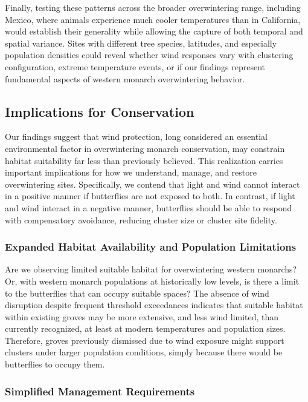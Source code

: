 \documentclass[insects,article,submit,pdftex,moreauthors]{Definitions/mdpi}
\begin{document}
Finally, testing these patterns across the broader overwintering range, including Mexico, where animals experience much cooler temperatures than in California, would establish their generality while allowing the capture of both temporal and spatial variance. Sites with different tree species, latitudes, and especially population densities could reveal whether wind responses vary with clustering configuration, extreme temperature events, or if our findings represent fundamental aspects of western monarch overwintering behavior.

\subsection{Implications for Conservation}

Our findings suggest that wind protection, long considered an essential environmental factor in overwintering monarch conservation, may constrain habitat suitability far less than previously believed. This realization carries important implications for how we understand, manage, and restore overwintering sites. Specifically, we contend that light and wind cannot interact in a positive manner if butterflies are not exposed to both. In contrast, if light and wind interact in a negative manner, butterflies should be able to respond with compensatory avoidance, reducing cluster size or cluster site fidelity.

\subsubsection{Expanded Habitat Availability and Population Limitations}

Are we observing limited suitable habitat for overwintering western monarchs? Or, with western monarch populations at historically low levels, is there a limit to the butterflies that can occupy suitable spaces? The absence of wind disruption despite frequent threshold exceedances indicates that suitable habitat within existing groves may be more extensive, and less wind limited, than currently recognized, at least at modern temperatures and population sizes. Therefore, groves previously dismissed due to wind exposure might support clusters under larger population conditions, simply because there would be butterflies to occupy them.

\subsubsection{Simplified Management Requirements}
\end{document}
